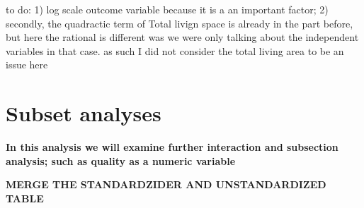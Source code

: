 \documentclass[a4paper]{article}
\begin{document}
to do: 1) log scale outcome variable because it is a an important factor; 2) secondly, the quadractic term of Total livign space is already in the part before, but here the rational is different was we were only talking about the independent variables in that case. as such I did not consider the total living area to be an issue here 




\section{Subset analyses}
\textbf{In this analysis we will examine further interaction and subsection analysis; such as quality as a numeric variable}














 
 

\textbf{MERGE THE STANDARDZIDER AND UNSTANDARDIZED TABLE}
\end{document}
